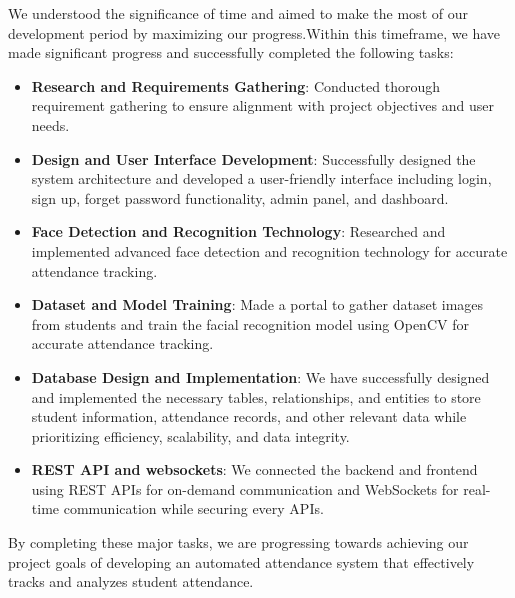  We understood the significance of time and aimed to make the most of our development period by maximizing our progress.Within this timeframe, we have made significant progress and successfully completed the following tasks:\\

\begin{itemize}
\item \textbf{Research and Requirements Gathering}: Conducted thorough requirement gathering to ensure alignment with project objectives and user needs.
\item \textbf {Design and User Interface Development}: Successfully designed the system architecture and developed a user-friendly interface including login, sign up, forget password functionality, admin panel, and dashboard.
\item \textbf
{Face Detection and Recognition Technology}: Researched and implemented advanced face detection and recognition technology for accurate attendance tracking.
\item \textbf { Dataset and Model Training}: Made a portal to gather dataset images from students and train the facial recognition model using OpenCV for accurate attendance tracking.
\item\textbf { Database Design and Implementation}: We have successfully designed and implemented the necessary tables, relationships, and entities to store student information, attendance records, and other relevant data while prioritizing efficiency, scalability, and data integrity.
\item\textbf{REST API and websockets}: We connected the backend and frontend using REST APIs for on-demand communication and WebSockets for real-time communication while securing every APIs.
\end{itemize}


By completing these major tasks, we are progressing towards achieving our project goals of developing an automated attendance system that effectively tracks and analyzes student attendance.